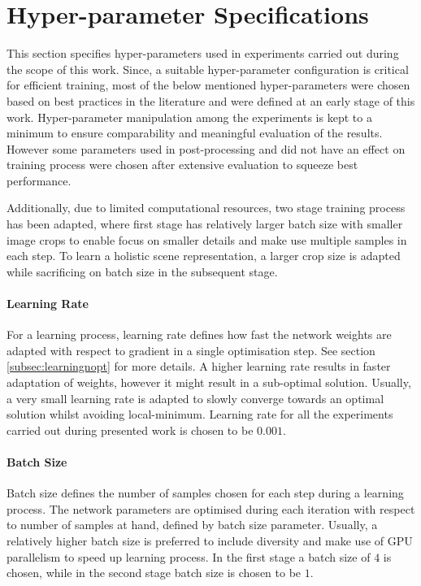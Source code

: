 \section{Hyper-parameter Specifications}

This section specifies hyper-parameters used in experiments carried out during the scope of this work. Since, a suitable hyper-parameter configuration is critical for efficient training, most of the below mentioned hyper-parameters were chosen based on best practices in the literature and were defined at an early stage of this work.  Hyper-parameter manipulation among the experiments is kept to a minimum to ensure comparability and meaningful evaluation of the results. However some parameters used in post-processing and did not have an effect on training process were chosen after extensive evaluation to squeeze best performance.

Additionally, due to limited computational resources, two stage training process has been adapted, where first stage has relatively larger batch size with smaller image crops to enable focus on smaller details and make use multiple samples in each step. To learn a holistic scene representation, a larger crop size is adapted while sacrificing on batch size in the subsequent stage. 


\paragraph{Learning Rate}

For a learning process, learning rate defines how fast the network weights are adapted with respect to gradient in a single optimisation step. See section \ref{subsec:learningnopt} for more details. A higher learning rate results in faster adaptation of weights, however it might result in a sub-optimal solution. Usually, a very small learning rate is adapted to slowly converge towards an optimal solution whilst avoiding local-minimum. Learning rate for all the experiments carried out during presented work is chosen to be $0.001$.

\paragraph{Batch Size}

Batch size defines the number of samples chosen for each step during a learning process. The network parameters are optimised during each iteration with respect to number of samples at hand, defined by batch size parameter. Usually, a relatively higher batch size is preferred to include diversity and make use of GPU parallelism to speed up learning process. In the first stage a batch size of $4$ is chosen, while in the second stage batch size is chosen to be $1$.


